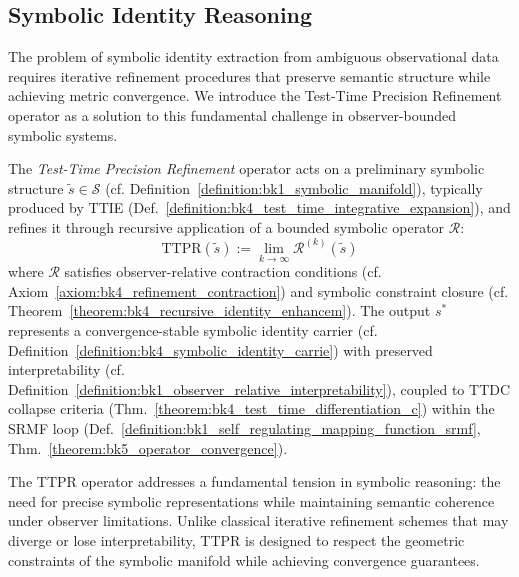 \subsection{Symbolic Identity Reasoning}
\label{subsec:bk4_symbolic_identity_reasoning}

The problem of symbolic identity extraction from ambiguous observational data requires iterative refinement procedures that preserve semantic structure while achieving metric convergence. We introduce the Test-Time Precision Refinement operator as a solution to this fundamental challenge in observer-bounded symbolic systems.

\begin{definition}
\label{definition:bk4_test_time_precision_refinement}
The \emph{Test-Time Precision Refinement} operator acts on a preliminary symbolic structure $\tilde{s} \in \mathcal{S}$ (cf. Definition~\ref{definition:bk1_symbolic_manifold}), typically produced by TTIE (Def.~\ref{definition:bk4_test_time_integrative_expansion}), and refines it through recursive application of a bounded symbolic operator $\mathcal{R}$:
\[
\mathrm{TTPR}(\tilde{s}) := \lim_{k \to \infty} \mathcal{R}^{(k)}(\tilde{s})
\]
where $\mathcal{R}$ satisfies observer-relative contraction conditions (cf. Axiom~\ref{axiom:bk4_refinement_contraction}) and symbolic constraint closure (cf. Theorem~\ref{theorem:bk4_recursive_identity_enhancem}). The output $s^*$ represents a convergence-stable symbolic identity carrier (cf. Definition~\ref{definition:bk4_symbolic_identity_carrie}) with preserved interpretability (cf. Definition~\ref{definition:bk1_observer_relative_interpretability}), coupled to TTDC collapse criteria (Thm.~\ref{theorem:bk4_test_time_differentiation_c}) within the SRMF loop (Def.~\ref{definition:bk1_self_regulating_mapping_function_srmf}, Thm.~\ref{theorem:bk5_operator_convergence}).
\end{definition}

The TTPR operator addresses a fundamental tension in symbolic reasoning: the need for precise symbolic representations while maintaining semantic coherence under observer limitations. Unlike classical iterative refinement schemes that may diverge or lose interpretability, TTPR is designed to respect the geometric constraints of the symbolic manifold while achieving convergence guarantees.

